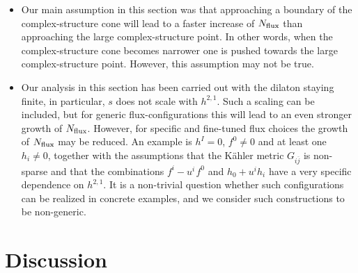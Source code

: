 \documentclass[12pt,a4paper]{article}
\newcommand{\ov}{\overline}
\newcommand{\op}{\hspace{1pt}}
\numberwithin{equation}{section}
\begin{document}
\begin{itemize}
\item Our main assumption in this section was that 
approaching a boundary of the complex-structure cone will lead to 
a faster increase of $N_{\rm flux}$ than 
approaching the large complex-structure point. 
In other words, when the complex-structure cone becomes narrower one is 
pushed towards the large complex-structure point. 
However, this assumption may  not be true.



\item Our analysis in this section has been 
carried out with the dilaton 
staying finite, in particular, $s$ does not scale with $h^{2,1}$. 
Such a scaling can be included, 
but for generic flux-configurations this will lead
to an even stronger growth of $N_{\rm flux}$. 
However, for specific and fine-tuned flux choices 
the growth of $N_{\rm flux}$ may be reduced. 
An example is $h^I=0$, $f^0\neq0$ and at least 
one $h_i\neq0$, together with the assumptions
that the K\"ahler metric $G_{i\ov j}$ is 
non-sparse and  
that the combinations $f^i-u^i\op f^0$ and $h_0+u^ih_i$ 
have a very specific dependence on 
$h^{2,1}$.
It is a non-trivial question whether such 
configurations can be realized in concrete examples, 
and we consider such constructions to be non-generic. 





\end{itemize}



\clearpage
\section{Discussion}
\label{sec_disc}
\end{document}
